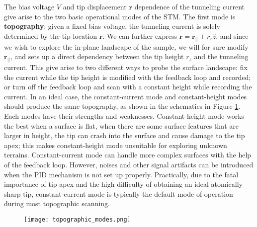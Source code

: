 The bias voltage $V$ and tip displacement $\mathbf{r}$ dependence of the tunneling current give arise to the two basic operational modes of the \ac{STM}. The first mode is \textbf{topography}: given a fixed bias voltage, the tunneling current is solely determined by the tip location $\mathbf{r}$. We can further express $\mathbf{r} = \mathbf{r_{||}} + r_z \hat{z}$, and since we wish to explore the in-plane landscape of the sample, we will for sure modify $\mathbf{r_{||}}$, and sets up a direct dependency between the tip height $r_z$ and the tunneling current. This give arise to two different ways to probe the surface landscape: fix the current while the tip height is modified with the feedback loop and recorded; or turn off the feedback loop and scan with a constant height while recording the current. In an ideal case, the constant-current mode and constant-height modes should produce the same topography, as shown in the schematics in Figure \ref{fig:topo_modes}. Each modes have their strengths and weaknesses. Constant-height mode works the best when a surface is flat, when there are some surface features that are larger in height, the tip can crash into the surface and cause damage to the tip apex; this makes constant-height mode unsuitable for exploring unknown terrains. Constant-current mode can handle more complex surfaces with the help of the feedback loop. However, noises and other signal artifacts can be introduced when the PID mechanism is not set up properly. Practically, due to the fatal importance of tip apex and the high difficulty of obtaining an ideal atomically sharp tip, constant-current mode is typically the default mode of operation during most topographic scanning. 

 \begin{figure}
	\centering
	\texttt{[image: topographic\_modes.png]}
	\caption{}
	\label{fig:topo_modes}
\end{figure}


